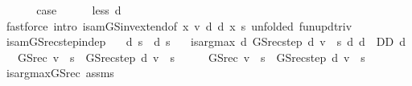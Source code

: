 \begin{isabellebody}
\isanewline
\ \ \isamarkupfalse%
\isanewline
\ \ \isamarkupfalse%
\ {\isacharquery}{\kern0pt}case\isanewline
\ \ \ \ \isamarkupfalse%
\ less\ d\isanewline
\ \ \ \ \isamarkupfalse%
\ {\isacharparenleft}{\kern0pt}fastforce\ intro{\isacharbang}{\kern0pt}{\isacharcolon}{\kern0pt}\ is{\isacharunderscore}{\kern0pt}am{\isacharunderscore}{\kern0pt}GS{\isacharunderscore}{\kern0pt}inv{\isacharunderscore}{\kern0pt}extend{\isacharbrackleft}{\kern0pt}of\ x\ v\ d\ {\isachardoublequoteopen}d\ x{\isachardoublequoteclose}\ s{\isacharcomma}{\kern0pt}\ unfolded\ fun{\isacharunderscore}{\kern0pt}upd{\isacharunderscore}{\kern0pt}triv{\isacharbrackright}{\kern0pt}{\isacharparenright}{\kern0pt}\isanewline
{}\isamarkupfalse%
%
\endisatagproof
{\isafoldproof}%
%
\isadelimproof
\isanewline
%
\endisadelimproof
\isanewline
{}\isamarkupfalse%
\ is{\isacharunderscore}{\kern0pt}am{\isacharunderscore}{\kern0pt}GS{\isacharunderscore}{\kern0pt}rec{\isacharunderscore}{\kern0pt}step{\isacharunderscore}{\kern0pt}indep{\isacharcolon}{\kern0pt}\isanewline
\ \ \ {\isachardoublequoteopen}d\ s\ {\isacharequal}{\kern0pt}\ d{\isacharprime}{\kern0pt}\ s{\isachardoublequoteclose}\isanewline
\ \ \ {\isachardoublequoteopen}is{\isacharunderscore}{\kern0pt}arg{\isacharunderscore}{\kern0pt}max\ {\isacharparenleft}{\kern0pt}{\isasymlambda}d{\isachardot}{\kern0pt}\ GS{\isacharunderscore}{\kern0pt}rec{\isacharunderscore}{\kern0pt}step\ d\ v\ {\isachardollar}{\kern0pt}\ s{\isacharparenright}{\kern0pt}\ {\isacharparenleft}{\kern0pt}{\isasymlambda}d{\isachardot}{\kern0pt}\ d\ {\isasymin}\ D\isactrlsub D{\isacharparenright}{\kern0pt}\ d{\isachardoublequoteclose}\isanewline
\ \ \ {\isachardoublequoteopen}GS{\isacharunderscore}{\kern0pt}rec\ v\ {\isachardollar}{\kern0pt}\ s\ {\isacharequal}{\kern0pt}\ GS{\isacharunderscore}{\kern0pt}rec{\isacharunderscore}{\kern0pt}step\ d{\isacharprime}{\kern0pt}\ v\ {\isachardollar}{\kern0pt}\ s{\isachardoublequoteclose}\isanewline
%
\isadelimproof
%
\endisadelimproof
%
\isatagproof
{}\isamarkupfalse%
\ {\isacharminus}{\kern0pt}\isanewline
\ \ \isamarkupfalse%
\ {\isachardoublequoteopen}GS{\isacharunderscore}{\kern0pt}rec\ v\ {\isachardollar}{\kern0pt}\ s\ {\isacharequal}{\kern0pt}\ GS{\isacharunderscore}{\kern0pt}rec{\isacharunderscore}{\kern0pt}step\ d\ v\ {\isachardollar}{\kern0pt}\ s{\isachardoublequoteclose}\isanewline
\ \ \ \ \isamarkupfalse%
\ is{\isacharunderscore}{\kern0pt}arg{\isacharunderscore}{\kern0pt}max{\isacharunderscore}{\kern0pt}GS{\isacharunderscore}{\kern0pt}rec{\isacharprime}{\kern0pt}\ assms{\isacharparenleft}{\kern0pt}{}{\isacharparenright}{\kern0pt}\ \isamarkupfalse%

\end{isabellebody}
